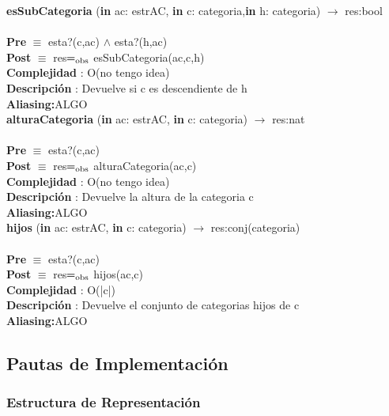 \documentclass[10pt, a4paper]{article}
\begin{document}
	\textbf{esSubCategoria} (\textbf{in} ac: estrAC, \textbf{in} c: categoria,\textbf{in} h: categoria) $\longrightarrow$ res:bool\\\\
	\textbf{Pre} $\equiv$ {esta?(c,ac) $\wedge$ esta?(h,ac)}\\
	\textbf{Post} $\equiv$ {res$=_{\mathrm{obs}}$ esSubCategoria(ac,c,h)}\\
	\textbf{Complejidad} : O(no tengo idea)\\
	\textbf{Descripci\'{o}n} : Devuelve si c es descendiente de h\\
	\textbf{Aliasing:}ALGO \\
	
	\textbf{alturaCategoria} (\textbf{in} ac: estrAC, \textbf{in} c: categoria) $\longrightarrow$ res:nat\\\\
	\textbf{Pre} $\equiv$ {esta?(c,ac)}\\
	\textbf{Post} $\equiv$ {res$=_{\mathrm{obs}}$ alturaCategoria(ac,c)}\\
	\textbf{Complejidad} : O(no tengo idea)\\
	\textbf{Descripci\'{o}n} : Devuelve la altura de la categoria c\\
	\textbf{Aliasing:}ALGO \\
	
	\textbf{hijos} (\textbf{in} ac: estrAC, \textbf{in} c: categoria) $\longrightarrow$ res:conj(categoria)\\\\
	\textbf{Pre} $\equiv$ {esta?(c,ac)}\\
	\textbf{Post} $\equiv$ {res$=_{\mathrm{obs}}$ hijos(ac,c)}\\
	\textbf{Complejidad} : O(|c|)\\
	\textbf{Descripci\'{o}n} : Devuelve el conjunto de categorias hijos de c\\
	\textbf{Aliasing:}ALGO \\

    \subsection{\huge Pautas de Implementaci\'{o}n}	

        \subsubsection{\Large Estructura de Representaci\'{o}n} 
\end{document}
